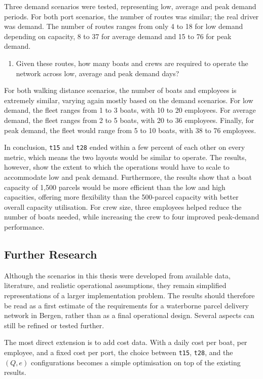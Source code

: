 \documentclass[12pt]{article}
\begin{document}
Three demand scenarios were tested, representing low, average and peak demand periods. For both port scenarios, the number of routes was similar; the real driver was demand. The number of routes ranges from only 4 to 18 for low demand depending on capacity, 8 to 37 for average demand and 15 to 76 for peak demand.

\begin{enumerate}[resume]
  \item Given these routes, how many boats and crews are required to operate the network across low, average and peak demand days?
\end{enumerate}

For both walking distance scenarios, the number of boats and employees is extremely similar, varying again mostly based on the demand scenarios. For low demand, the fleet ranges from 1 to 3 boats, with 10 to 20 employees. For average demand, the fleet ranges from 2 to 5 boats, with 20 to 36 employees. Finally, for peak demand, the fleet would range from 5 to 10 boats, with 38 to 76 employees.


In conclusion, \texttt{t15} and \texttt{t28} ended within a few percent of each other on every metric, which means the two layouts would be similar to operate. The results, however, show the extent to which the operations would have to scale to accommodate low and peak demand. Furthermore, the results show that a boat capacity of 1,500 parcels would be more efficient than the low and high capacities, offering more flexibility than the 500-parcel capacity with better overall capacity utilisation. For crew size, three employees helped reduce the number of boats needed, while increasing the crew to four improved peak-demand performance.

\subsection{Further Research}
\label{subsec:further-research}

Although the scenarios in this thesis were developed from available data, literature, and realistic operational assumptions, they remain simplified representations of a larger implementation problem. The results should therefore be read as a first estimate of the requirements for a waterborne parcel delivery network in Bergen, rather than as a final operational design. Several aspects can still be refined or tested further.

The most direct extension is to add cost data. With a daily cost per boat, per employee, and a fixed cost per port, the choice between \texttt{t15}, \texttt{t28}, and the \((Q, e)\) configurations becomes a simple optimisation on top of the existing results.
\end{document}

